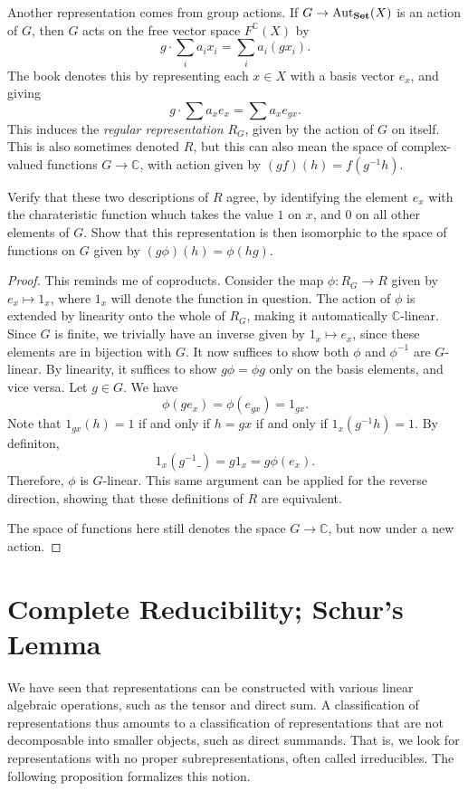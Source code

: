 Another representation comes from group actions. If $G\to \operatorname{Aut}_{\mathbf{Set} }(X) $ is an action of $G$, then $G$ acts on the free vector space $F^\mathbb{C} (X)$ by
\[
	g\cdot \sum_{i} a_i x_i=\sum_{i} a_i (gx_i)
.\]
The book denotes this by representing each $x\in X$ with a basis vector $e_x$, and giving
\[
	g\cdot \sum a_x e_x=\sum a_x e_{gx} 
.\]
This induces the \emph{regular representation} $R_G$, given by the action of $G$ on itself. This is also sometimes denoted $R$, but this can also mean the space of complex-valued functions $G\to \mathbb{C} $, with action given by $(gf)\left( h \right) =f(g^{-1} h)$.
\begin{exercise}
	Verify that these two descriptions of $R$ agree, by identifying the element $e_x$ with the charateristic function whuch takes the value $1$ on $x$, and $0$ on all other elements of $G$. Show that this representation is then isomorphic to the space of functions on $G$ given by $(g\phi )(h)=\phi (hg)$.
\end{exercise}
\begin{proof}
	This reminds me of coproducts. Consider the map $\phi : R_G \to R$ given by $e_x\mapsto 1_x$, where $1_x$ will denote the function in question. The action of $\phi $ is extended by linearity onto the whole of $R_G$, making it automatically $\mathbb{C} $-linear. Since $G$ is finite, we trivially have an inverse given by $1_x\mapsto e_x$, since these elements are in bijection with $G$. It now suffices to show both $\phi $ and $\phi ^{-1} $ are $G$-linear. By linearity, it suffices to show $g\phi =\phi g$ only on the basis elements, and vice versa. Let $g\in G$. We have
	\[
		\phi (ge_x)=\phi (e_{gx} )=1_{gx}
	.\]
	Note that $1_{gx} (h)=1$ if and only if $h=gx$ if and only if $1_x\left( g^{-1} h \right) =1$. By definiton,
	\[
		1_x\left( g^{-1} \_ \right) =g1_x=g\phi (e_x)
	.\]
	Therefore, $\phi $ is $G$-linear. This same argument can be applied for the reverse direction, showing that these definitions of $R$ are equivalent.

	The space of functions here still denotes the space $G\to \mathbb{C} $, but now under a new action. 
\end{proof}
\section{Complete Reducibility; Schur's Lemma}
We have seen that representations can be constructed with various linear algebraic operations, such as the tensor and direct sum. A classification of representations thus amounts to a classification of representations that are not decomposable into smaller objects, such as direct summands. That is, we look for representations with no proper subrepresentations, often called irreducibles. The following proposition formalizes this notion.

